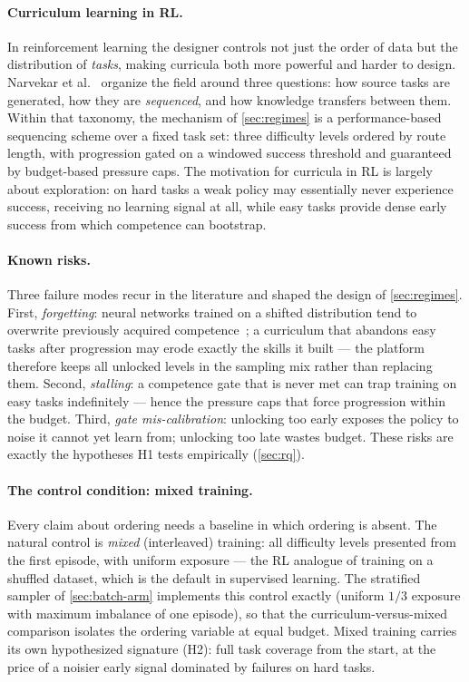 \paragraph{Curriculum learning in RL.}
In reinforcement learning the designer controls not just the order of
data but the distribution of \emph{tasks}, making curricula both more
powerful and harder to design. Narvekar et al.~\cite{narvekar2020curriculum}
organize the field around three questions: how source tasks are
generated, how they are \emph{sequenced}, and how knowledge transfers
between them. Within that taxonomy, the mechanism of \cref{sec:regimes}
is a performance-based sequencing scheme over a fixed task set: three
difficulty levels ordered by route length, with progression gated on a
windowed success threshold and guaranteed by budget-based pressure caps.
The motivation for curricula in RL is largely about exploration: on hard
tasks a weak policy may essentially never experience success, receiving
no learning signal at all, while easy tasks provide dense early success
from which competence can bootstrap.

\paragraph{Known risks.}
Three failure modes recur in the literature and shaped the design of
\cref{sec:regimes}. First, \emph{forgetting}: neural networks trained on
a shifted distribution tend to overwrite previously acquired
competence~\cite{french1999catastrophic}; a curriculum that abandons
easy tasks after progression may erode exactly the skills it built ---
the platform therefore keeps all unlocked levels in the sampling mix
rather than replacing them. Second, \emph{stalling}: a competence gate
that is never met can trap training on easy tasks indefinitely ---
hence the pressure caps that force progression within the budget.
Third, \emph{gate mis-calibration}: unlocking too early exposes the
policy to noise it cannot yet learn from; unlocking too late wastes
budget. These risks are exactly the hypotheses H1 tests empirically
(\cref{sec:rq}).

\paragraph{The control condition: mixed training.}
Every claim about ordering needs a baseline in which ordering is absent.
The natural control is \emph{mixed} (interleaved) training: all
difficulty levels presented from the first episode, with uniform
exposure --- the RL analogue of training on a shuffled dataset, which is
the default in supervised learning. The stratified sampler of
\cref{sec:batch-arm} implements this control exactly (uniform $1/3$
exposure with maximum imbalance of one episode), so that the
curriculum-versus-mixed comparison isolates the ordering variable at
equal budget. Mixed training carries its own hypothesized signature
(H2): full task coverage from the start, at the price of a noisier early
signal dominated by failures on hard tasks.

